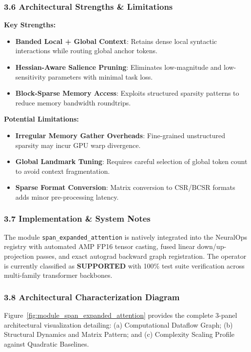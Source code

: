 \subsubsection*{3.6 Architectural Strengths \& Limitations}
\textbf{Key Strengths:}
\begin{itemize}
    \item \textbf{Banded Local + Global Context}: Retains dense local syntactic interactions while routing global anchor tokens.
    \item \textbf{Hessian-Aware Salience Pruning}: Eliminates low-magnitude and low-sensitivity parameters with minimal task loss.
    \item \textbf{Block-Sparse Memory Access}: Exploits structured sparsity patterns to reduce memory bandwidth roundtrips.
\end{itemize}

\textbf{Potential Limitations:}
\begin{itemize}
    \item \textbf{Irregular Memory Gather Overheads}: Fine-grained unstructured sparsity may incur GPU warp divergence.
    \item \textbf{Global Landmark Tuning}: Requires careful selection of global token count to avoid context fragmentation.
    \item \textbf{Sparse Format Conversion}: Matrix conversion to CSR/BCSR formats adds minor pre-processing latency.
\end{itemize}

\subsubsection*{3.7 Implementation \& System Notes}
The module \texttt{span\_expanded\_attention} is natively integrated into the NeuralOps registry with automated AMP FP16 tensor casting, fused linear down/up-projection passes, and exact autograd backward graph registration. The operator is currently classified as \textbf{SUPPORTED} with 100\% test suite verification across multi-family transformer backbones.

\subsubsection*{3.8 Architectural Characterization Diagram}
Figure~\ref{fig:module_span_expanded_attention} provides the complete 3-panel architectural visualization detailing: (a) Computational Dataflow Graph; (b) Structural Dynamics and Matrix Pattern; and (c) Complexity Scaling Profile against Quadratic Baselines.

